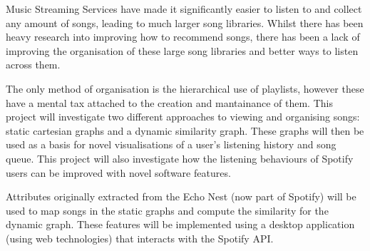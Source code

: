Music Streaming Services have made it significantly easier to listen to and collect any amount of songs, leading to much larger song libraries. Whilst there has been heavy research into improving how to recommend songs, there has been a lack of improving the organisation of these large song libraries and better ways to listen across them. 

The only method of organisation is the hierarchical use of playlists, however these have a mental tax attached to the creation and mantainance of them. This project will investigate two different approaches to viewing and organising songs: static cartesian graphs and a dynamic similarity graph. These graphs will then be used as a basis for novel visualisations of a user's listening history and song queue. This project will also investigate how the listening behaviours of Spotify users can be improved with novel software features.

Attributes originally extracted from the Echo Nest (now part of Spotify) will be used to map songs in the static graphs and compute the similarity for the dynamic graph. These features will be implemented using a desktop application (using web technologies) that interacts with the Spotify API.